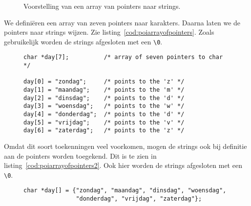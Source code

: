 \begin{figure}[!ht]
\centering
{}
\caption{Voorstelling van een array van pointers naar strings.}
\label{fig:poiarrayofpointers}
\end{figure}

We definiëren een array van zeven pointers naar karakters. Daarna laten we de pointers naar strings wijzen. Zie listing~\ref{cod:poiarrayofpointers}. Zoals gebruikelijk worden de strings afgesloten met een \lstinline|\0|.

\begin{figure}[!ht]
\begin{lstlisting}[caption=Een array van pointers.,label=cod:poiarrayofpointers]
char *day[7];          /* array of seven pointers to char */

day[0] = "zondag";     /* points to the 'z' */
day[1] = "maandag";    /* points to the 'm' */
day[2] = "dinsdag";    /* points to the 'd' */
day[3] = "woensdag";   /* points to the 'w' */
day[4] = "donderdag";  /* points to the 'd' */
day[5] = "vrijdag";    /* points to the 'v' */
day[6] = "zaterdag";   /* points to the 'z' */
\end{lstlisting}
\end{figure}

Omdat dit soort toekenningen veel voorkomen, mogen de strings ook bij definitie aan de pointers worden toegekend. Dit is te zien in listing~\ref{cod:poiarrayofpointers2}. Ook hier worden de strings afgesloten met een \lstinline|\0|.

\begin{figure}[!ht]
\begin{lstlisting}[caption=Een array van pointers naar strings met initialisatie.,label=cod:poiarrayofpointers2]
char *day[] = {"zondag", "maandag", "dinsdag", "woensdag",
               "donderdag", "vrijdag", "zaterdag"};
\end{lstlisting}
\end{figure}

